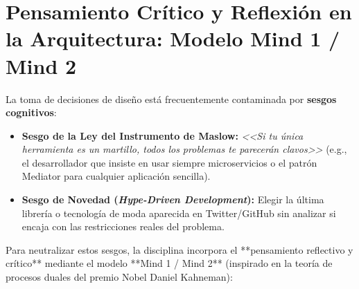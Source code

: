 \section{Pensamiento Crítico y Reflexión en la Arquitectura: Modelo Mind 1 / Mind 2}
\label{sec:reflection-mind}

La toma de decisiones de diseño está frecuentemente contaminada por \textbf{sesgos cognitivos}:
\begin{itemize}[leftmargin=1.5em]
  \item \textbf{Sesgo de la Ley del Instrumento de Maslow:} \emph{<<Si tu única herramienta es un martillo, todos los problemas te parecerán clavos>>} (e.g., el desarrollador que insiste en usar siempre microservicios o el patrón Mediator para cualquier aplicación sencilla).
  \item \textbf{Sesgo de Novedad (\emph{Hype-Driven Development}):} Elegir la última librería o tecnología de moda aparecida en Twitter/GitHub sin analizar si encaja con las restricciones reales del problema.
\end{itemize}

Para neutralizar estos sesgos, la disciplina incorpora el **pensamiento reflectivo y crítico** mediante el modelo **Mind 1 / Mind 2** (inspirado en la teoría de procesos duales del premio Nobel Daniel Kahneman):

